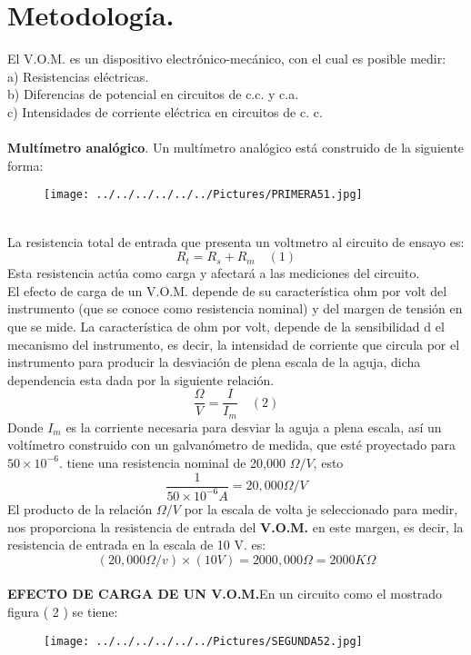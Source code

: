 \documentclass[11pt,a4paper]{article}
\begin{document}
\section{Metodolog\'{i}a.}
El V.O.M. es un dispositivo electr\'{o}nico-mec\'{a}nico, con el cual es posible medir:\\
a) Resistencias el\'{e}ctricas.\\
b) Diferencias de potencial en circuitos de c.c. y c.a.\\
c) Intensidades de corriente el\'{e}ctrica en circuitos de c. c.\\
\\
\textbf{Mult\'{i}metro anal\'{o}gico}. Un mult\'{i}metro anal\'{o}gico est\'{a} construido de la siguiente forma:
\\
\begin{figure}[hbtp]
\centering
\texttt{[image: ../../../../../../Pictures/PRIMERA51.jpg]}
\end{figure}
\\
La resistencia total de entrada que presenta un voltmetro al circuito de ensayo es:
\[{R}_{t}= {R}_{s} + {R}_{m} \quad (1)\]
Esta resistencia act\'{u}a como carga y afectar\'{a} a las mediciones del circuito. \\
El efecto de carga de un V.O.M. depende de su caracter\'{i}stica ohm por volt del instrumento (que se conoce como resistencia nominal) y del margen de
tensi\'{o}n en que se mide.
La caracter\'{i}stica de ohm por volt, depende de la sensibilidad d el mecanismo
del instrumento, es decir, la intensidad de corriente que circula por el instrumento para producir la desviaci\'{o}n de plena escala de la aguja, dicha dependencia esta dada por la siguiente relaci\'{o}n.
\[\frac{\Omega}{V}= \frac{I}{{I}_{m}} \quad (2)\]
Donde ${I}_{m}$ es la corriente necesaria para desviar la aguja a plena escala, as\'{i} un volt\'{i}metro construido con un galvan\'{o}metro de medida, que est\'{e} proyectado para $50\times{10}^{ -6 } $. tiene una resistencia nominal de 20,000 $\Omega / V $, esto
\[\frac{1}{50\times{10}^{ -6 } A}= 20, 000 \Omega/V\]
El producto de la relaci\'{o}n $\Omega/V$ por la escala de volta je seleccionado para medir, nos proporciona la resistencia de entrada del \textbf{V.O.M.} en este margen, es decir, la resistencia de entrada en la escala de 10 V. es:
\[(20,000 \Omega/v)\times(10V)=2000,000 \Omega= 2000K \Omega\]
\\
\textbf{EFECTO DE CARGA DE UN V.O.M.}En un circuito como el mostrado figura ( 2 ) se tiene:
\\
\begin{figure}[hbtp]
\centering
\texttt{[image: ../../../../../../Pictures/SEGUNDA52.jpg]}
\end{figure}
\end{document}
